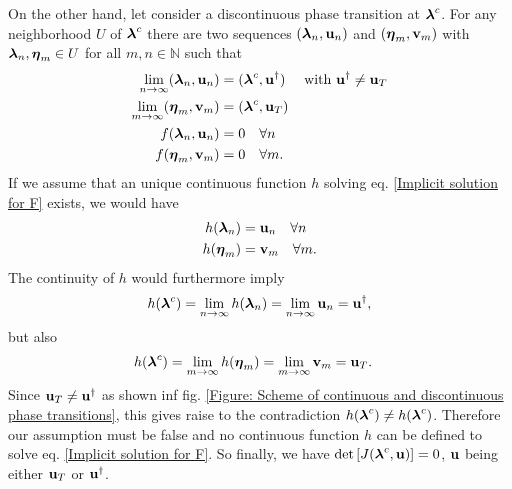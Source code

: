 \documentclass[
11pt, %
american, %
singlespacing, %
final, %
nolistspacing, %
liststotoc, %
headsepline, %
]{MastersDoctoralThesis} %
\begin{document}
On the other hand, let consider a discontinuous phase transition at $\boldsymbol{\mathrm{\lambda}}^c$. For any neighborhood $U$ of $\boldsymbol{\mathrm{\lambda}}^c$ there are two sequences $(\boldsymbol{\mathrm{\lambda}}_n, \boldsymbol{\mathrm{u}}_n)$ and $(\boldsymbol{\mathrm{\eta}}_m, \boldsymbol{\mathrm{v}}_m)$ with $\boldsymbol{\mathrm{\lambda}}_n, \boldsymbol{\mathrm{\eta}}_m \in U$ for all $m, n \in \mathbb{N}$ such that
\begin{align}
	\lim_{n \rightarrow \infty} (\boldsymbol{\mathrm{\lambda}}_n, \boldsymbol{\mathrm{u}}_n) &= (\boldsymbol{\mathrm{\lambda}}^c, \boldsymbol{\mathrm{u}}^\dagger) \quad \text{ with } \boldsymbol{\mathrm{u}}^\dagger \neq \boldsymbol{\mathrm{u}}_T \\
	\lim_{m \rightarrow \infty} (\boldsymbol{\mathrm{\eta}}_m, \boldsymbol{\mathrm{v}}_m) &= (\boldsymbol{\mathrm{\lambda}}^c, \boldsymbol{\mathrm{u}}_T) \\
	f(\boldsymbol{\mathrm{\lambda}}_n, \boldsymbol{\mathrm{u}}_n) &= 0 \quad \forall n \\
	f(\boldsymbol{\mathrm{\eta}}_m, \boldsymbol{\mathrm{v}}_m) &= 0 \quad \forall m.
\end{align}
If we assume that an unique continuous function $h$ solving eq. \eqref{Implicit solution for F} exists, we would have
\begin{align}
	h(\boldsymbol{\mathrm{\lambda}}_n) &= \boldsymbol{\mathrm{u}}_n \quad \forall n \\
	h(\boldsymbol{\mathrm{\eta}}_m) &= \boldsymbol{\mathrm{v}}_m \quad \forall m.
\end{align}
The continuity of $h$ would furthermore imply
\begin{align}
	h(\boldsymbol{\mathrm{\lambda}}^c) = \lim_{n \rightarrow \infty} h(\boldsymbol{\mathrm{\lambda}}_n) = \lim_{n \rightarrow \infty} \boldsymbol{\mathrm{u}}_n = \boldsymbol{\mathrm{u}}^\dagger,
\end{align}
but also
\begin{align}
	h(\boldsymbol{\mathrm{\lambda}}^c) &= \lim_{m \rightarrow \infty} h(\boldsymbol{\mathrm{\eta}}_m) = \lim_{m \rightarrow \infty} \boldsymbol{\mathrm{v}}_m = \boldsymbol{\mathrm{u}}_T.
\end{align}
Since $\boldsymbol{\mathrm{u}}_T \neq \boldsymbol{\mathrm{u}}^\dagger$ as shown inf fig. \ref{Figure: Scheme of continuous and discontinuous phase transitions}, this gives raise to the contradiction $h(\boldsymbol{\mathrm{\lambda}}^c) \neq h(\boldsymbol{\mathrm{\lambda}}^c)$. Therefore our assumption must be false and no continuous function $h$ can be defined to solve eq. \eqref{Implicit solution for F}. So finally, we have $\det\left[ J(\boldsymbol{\mathrm{\lambda}}^c, \boldsymbol{\mathrm{u}}) \right] = 0$, $\boldsymbol{\mathrm{u}}$ being either $\boldsymbol{\mathrm{u}}_T$ or $\boldsymbol{\mathrm{u}}^\dagger$.
\end{document}
